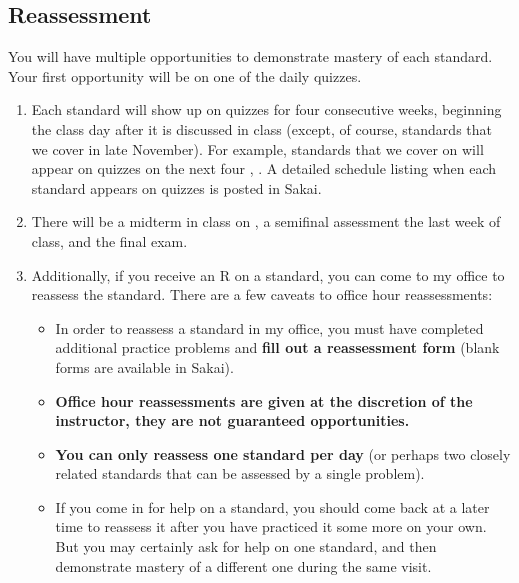 \documentclass[letterpaper]{article}
\begin{document}
\subsection*{\fontsize{10}{12}\selectfont Reassessment}
You will have multiple opportunities to demonstrate mastery of each standard.  Your first opportunity will be on one of the daily quizzes.  
\begin{enumerate}[1)]
\item Each standard will show up on quizzes for four consecutive weeks, beginning the class day after it is discussed in class (except, of course, standards that we cover in late November).  For example, standards that we cover on  will appear on quizzes on the next four , .  A detailed schedule listing when each standard appears on quizzes is posted in Sakai.
\item There will be a midterm in class on , a semifinal assessment the last week of class, and the final exam.
\item Additionally, if you receive an R on a standard, you can come to my office to reassess the standard.  There are a few caveats to office hour reassessments:
\begin{itemize}
\item In order to reassess a standard in my office, you must have completed additional practice problems and {\bf fill out a reassessment form} (blank forms are available in Sakai).
\item \textbf{Office hour reassessments are given at the discretion of the instructor, they are not guaranteed opportunities. } 
\item \textbf{You can only reassess one standard per day} (or perhaps two closely related standards that can be assessed by a single problem).
\item If you come in for help on a standard, you should come back at a later time to reassess it after you have practiced it some more on your own.  But you may certainly ask for help on one standard, and then demonstrate mastery of a different one during the same visit.

\end{itemize}
\end{enumerate}
\end{document}
